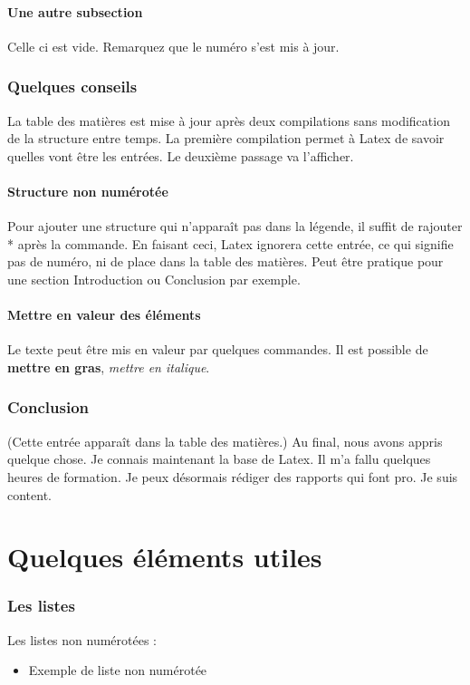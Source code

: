 \documentclass[10pt,a4paper]{report} %
\begin{document}
\subsection{Une autre subsection}
Celle ci est vide. Remarquez que le numéro s'est mis à jour.
\section{Quelques conseils}
La table des matières est mise à jour après deux compilations sans modification de la structure entre temps. La première compilation permet à Latex de savoir quelles vont être les entrées. Le deuxième passage va l'afficher.
\subsection*{Structure non numérotée}
Pour ajouter une structure qui n'apparaît pas dans la légende, il suffit de rajouter * après la commande. En faisant ceci, Latex ignorera cette entrée, ce qui signifie pas de numéro, ni de place dans la table des matières. Peut être pratique pour une section Introduction ou Conclusion par exemple.

\subsection{Mettre en valeur des éléments}
Le texte peut être mis en valeur par quelques commandes. Il est possible de \textbf{mettre en gras}, \emph{mettre en italique}.

\section*{Conclusion}
(Cette entrée apparaît dans la table des matières.)
Au final, nous avons appris quelque chose. Je connais maintenant la base de Latex. Il m'a fallu quelques heures de formation. Je peux désormais rédiger des rapports qui font pro. Je suis content.

\part{Quelques éléments utiles}
\section{Les listes}
Les listes non numérotées : 
\begin{itemize}
	\item Exemple de liste non numérotée
\end{itemize}
\end{document}
